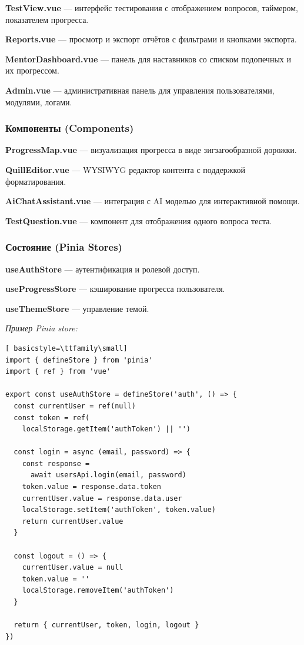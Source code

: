 \textbf{TestView.vue} --- интерфейс тестирования с отображением вопросов, таймером, показателем прогресса.

\textbf{Reports.vue} --- просмотр и экспорт отчётов с фильтрами и кнопками экспорта.

\textbf{MentorDashboard.vue} --- панель для наставников со списком подопечных и их прогрессом.

\textbf{Admin.vue} --- административная панель для управления пользователями, модулями, логами.

\subsubsection{Компоненты (Components)}

\textbf{ProgressMap.vue} --- визуализация прогресса в виде зигзагообразной дорожки.

\textbf{QuillEditor.vue} --- WYSIWYG редактор контента с поддержкой форматирования.

\textbf{AiChatAssistant.vue} --- интеграция с AI моделью для интерактивной помощи.

\textbf{TestQuestion.vue} --- компонент для отображения одного вопроса теста.

\subsubsection{Состояние (Pinia Stores)}

\textbf{useAuthStore} --- аутентификация и ролевой доступ.

\textbf{useProgressStore} --- кэширование прогресса пользователя.

\textbf{useThemeStore} --- управление темой.

\textit{Пример Pinia store:}
\begin{lstlisting}[ basicstyle=\ttfamily\small]
import { defineStore } from 'pinia'
import { ref } from 'vue'

export const useAuthStore = defineStore('auth', () => {
  const currentUser = ref(null)
  const token = ref(
    localStorage.getItem('authToken') || '')
  
  const login = async (email, password) => {
    const response = 
      await usersApi.login(email, password)
    token.value = response.data.token
    currentUser.value = response.data.user
    localStorage.setItem('authToken', token.value)
    return currentUser.value
  }
  
  const logout = () => {
    currentUser.value = null
    token.value = ''
    localStorage.removeItem('authToken')
  }
  
  return { currentUser, token, login, logout }
})
\end{lstlisting}

